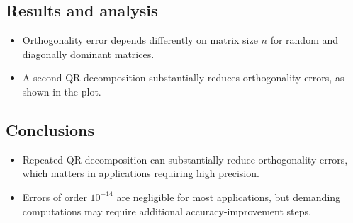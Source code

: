 \subsection{Results and analysis}
\begin{itemize}
    \item Orthogonality error depends differently on matrix size \( n \) for random and diagonally dominant matrices.
    \item A second QR decomposition substantially reduces orthogonality errors, as shown in the plot.
\end{itemize}

\subsection{Conclusions}
\begin{itemize}
    \item Repeated QR decomposition can substantially reduce orthogonality errors, which matters in applications requiring high precision.
    \item Errors of order \( 10^{-14} \) are negligible for most applications, but demanding computations may require additional accuracy-improvement steps.
\end{itemize}
